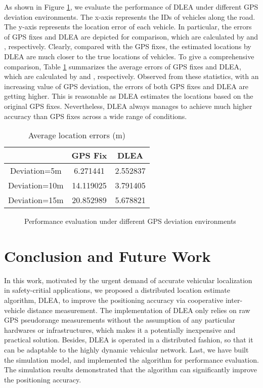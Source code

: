 \documentclass[letterpaper, 10 pt, conference]{ieeeconf}
\begin{document}
As shown in Figure \ref{fig:3}, we evaluate the performance of DLEA under different GPS deviation environments. The x-axis represents the IDs of vehicles along the road. The y-axis represents the location error of each vehicle. In particular, the errors of GPS fixes and DLEA are depicted for comparison, which are calculated by   and , respectively. Clearly, compared with the GPS fixes, the estimated locations by DLEA are much closer to the true locations of vehicles. To give a comprehensive comparison,  Table \ref{table:compare} summarizes the average errors of GPS fixes and DLEA, which are calculated by  and , respectively. Observed from these statistics, with an increasing value of GPS deviation, the errors of both GPS fixes and DLEA are getting higher. This is reasonable as DLEA estimates the locations based on the original GPS fixes.  Nevertheless,  DLEA always manages to achieve much higher accuracy than GPS fixes across a wide range of conditions.
\begin{table}[h]
\renewcommand{\arraystretch}{1.2}
\renewcommand{\tabcolsep}{0.7cm}
\caption{Average location errors (m)}
\label{table:compare}
\centering
\begin{tabular}{|c|c|c|}
\hline
 & GPS Fix & DLEA \\
\hline
Deviation=5m  & 6.271441 & 2.552837  \\
\hline
Deviation=10m  & 14.119025 &  3.791405 \\
\hline
Deviation=15m  & 20.852989 &  5.678821 \\
\hline
\end{tabular}
\end{table}


\begin{figure}[h]
\caption{Performance evaluation under different GPS deviation environments}
\label{fig:3}
\end{figure}



\section{Conclusion and Future Work}\label{con}
In this work, motivated by the urgent demand of accurate vehicular localization in safety-critial applications, we proposed a distributed location estimate algorithm, DLEA, to improve the positioning accuracy via cooperative inter-vehicle distance measurement. The implementation of DLEA only relies on  raw GPS pseudorange measurements without the assumption of any particular hardwares or infrastructures, which makes it a potentially inexpensive and practical solution. Besides, DLEA is operated in a distributed fashion, so that it can be adaptable to the highly dynamic vehicular network. Last, we have built the simulation model, and implemented the algorithm for performance evaluation. The simulation results demonstrated that the algorithm can significantly improve the positioning accuracy.
\end{document}

